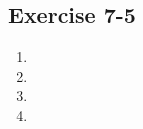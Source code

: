 \subsection{Exercise 7-5} %
\begin{enumerate}[noitemsep, label=\textbf{\arabic*}. ] 

\item %
\item %
\item %
\item %

\end{enumerate}

    

